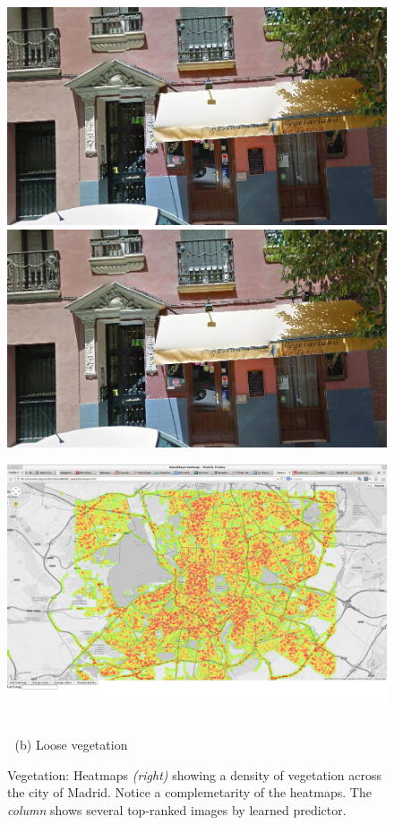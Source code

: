 \documentclass[runningheads, table]{llncs}
\begin{document}
\begin{figure}
\begin{minipage}{\linewidth}
\begin{minipage}{0.3\linewidth}
      \\ \vspace{-3mm} \\
      \includegraphics[width=0.49\linewidth]{imgs/cutout_pitch04.jpg}
      \includegraphics[width=0.49\linewidth]{imgs/cutout_pitch04.jpg}
    \end{minipage}
    \begin{minipage}{0.7\linewidth}
      \includegraphics[trim= 350 150 250 150, clip=true, width=\linewidth]{imgs/vege/mapT1.jpg}
    \end{minipage}
  \end{minipage}
  \\
  $\;$\hspace{30mm} (b) Loose vegetation
  \\
  \caption{
    Vegetation: Heatmaps \emph{(right)} showing a density of vegetation across the city of Madrid. Notice a complemetarity of the heatmaps. The \emph{column} shows several top-ranked images by learned predictor.
  }
\end{figure}
\end{document}
